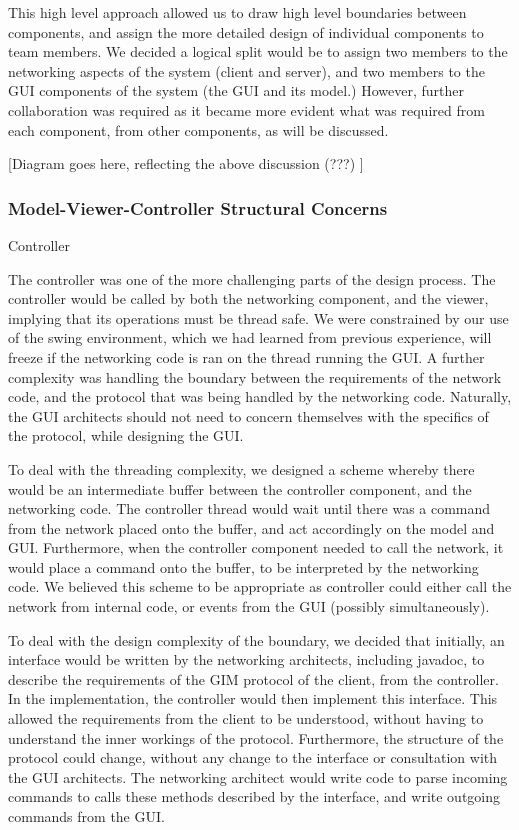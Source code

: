 This high level approach allowed us to draw high level boundaries between components, and assign the more detailed design of individual components to team members. We decided a logical split would be to assign two members to the networking aspects of the system (client and server), and two members to the GUI components of the system (the GUI and its model.) However, further collaboration was required as it became more evident what was required from each component, from other components, as will be discussed. 

[Diagram goes here, reflecting the above discussion (???) ]

\subsubsection{Model-Viewer-Controller Structural Concerns}

Controller

The controller was one of the more challenging parts of the design process. The controller would be called by both the networking component, and the viewer, implying that its operations must be thread safe. We were constrained by our use of the swing environment, which we had learned from previous experience, will freeze if the networking code is ran on the thread running the GUI. A further complexity was handling the boundary between the requirements of the network code, and the protocol that was being handled by the networking code. Naturally, the GUI architects should not need to concern themselves with the specifics of the protocol, while designing the GUI. 

To deal with the threading complexity, we designed a scheme whereby there would be an intermediate buffer between the controller component, and the networking code. The controller thread would wait until there was a command from the network placed onto the buffer, and act accordingly on the model and GUI. Furthermore, when the controller component needed to call the network, it would place a command onto the buffer, to be interpreted by the  networking code. We believed this scheme to be appropriate as controller could either call the network from internal code, or events from the GUI (possibly simultaneously).

To deal with the design complexity of the boundary, we decided that initially, an interface would be written by the networking architects, including javadoc, to describe the requirements of the GIM protocol of the client, from the controller. In the implementation, the controller would then implement this interface. This allowed the requirements from the client to be understood, without having to understand the inner workings of the protocol. Furthermore, the structure of the protocol could change, without any change to the interface or consultation with the GUI architects. The networking architect would write code to parse incoming commands to calls these methods described by the interface, and write outgoing commands from the GUI.

